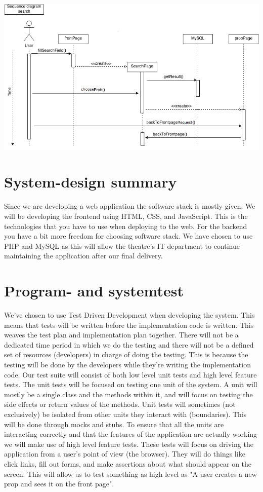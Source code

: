 \documentclass[12pt]{article}
\begin{document}
\includegraphics[scale=0.6]{sequenceDiagram_search.png}\\
\section{System-design summary}
Since we are developing a web application the software stack is mostly given. We will be developing the frontend using HTML, CSS, and JavaScript. This is the technologies that you have to use when deploying to the web.
\newline
For the backend you have a bit more freedom for choosing software stack. We have chosen to use PHP and MySQL as this will allow the theatre's IT department to continue maintaining the application after our final delivery.
\section{Program- and systemtest}
We've chosen to use Test Driven Development when developing the system. This means that tests will be written before the implementation code is written. This weaves the test plan and implementation plan together. There will not be a dedicated time period in which we do the testing and there will not be a defined set of resources (developers) in charge of doing the testing. This is because the testing will be done by the developers while they're writing the implementation code.
\newline
Our test suite will consist of both low level unit tests and high level feature tests. The unit tests will be focused on testing one unit of the system. A unit will mostly be a single class and the methods within it, and will focus on testing the side effects or return values of the methods. Unit tests will sometimes (not exclusively) be isolated from other units they interact with (boundaries). This will be done through mocks and stubs.
\newline
\newline
To ensure that all the units are interacting correctly and that the features of the application are actually working we will make use of high level feature tests. These tests will focus on driving the application from a user's point of view (the browser). They will do things like click links, fill out forms, and make assertions about what should appear on the screen. This will allow us to test something as high level as "A user creates a new prop and sees it on the front page".
\end{document}
